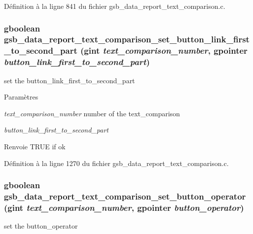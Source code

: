 Définition à la ligne 841 du fichier gsb\_\-data\_\-report\_\-text\_\-comparison.c.

\subsubsection[{gsb\_\-data\_\-report\_\-text\_\-comparison\_\-set\_\-button\_\-link\_\-first\_\-to\_\-second\_\-part}]{\setlength{\rightskip}{0pt plus 5cm}gboolean gsb\_\-data\_\-report\_\-text\_\-comparison\_\-set\_\-button\_\-link\_\-first\_\-to\_\-second\_\-part (gint {\em text\_\-comparison\_\-number}, \/  gpointer {\em button\_\-link\_\-first\_\-to\_\-second\_\-part})}\label{gsb__data__report__text__comparison_8h_afc607fa71339ca5587076a4ad8638f0d}
set the button\_\-link\_\-first\_\-to\_\-second\_\-part


\begin{DoxyParams}{Paramètres}
\item[{\em text\_\-comparison\_\-number}]number of the text\_\-comparison \item[{\em button\_\-link\_\-first\_\-to\_\-second\_\-part}]\end{DoxyParams}
\begin{DoxyReturn}{Renvoie}
TRUE if ok 
\end{DoxyReturn}


Définition à la ligne 1270 du fichier gsb\_\-data\_\-report\_\-text\_\-comparison.c.

\subsubsection[{gsb\_\-data\_\-report\_\-text\_\-comparison\_\-set\_\-button\_\-operator}]{\setlength{\rightskip}{0pt plus 5cm}gboolean gsb\_\-data\_\-report\_\-text\_\-comparison\_\-set\_\-button\_\-operator (gint {\em text\_\-comparison\_\-number}, \/  gpointer {\em button\_\-operator})}\label{gsb__data__report__text__comparison_8h_a19673b6f71dc4ee8f6348868e5224bf5}
set the button\_\-operator


